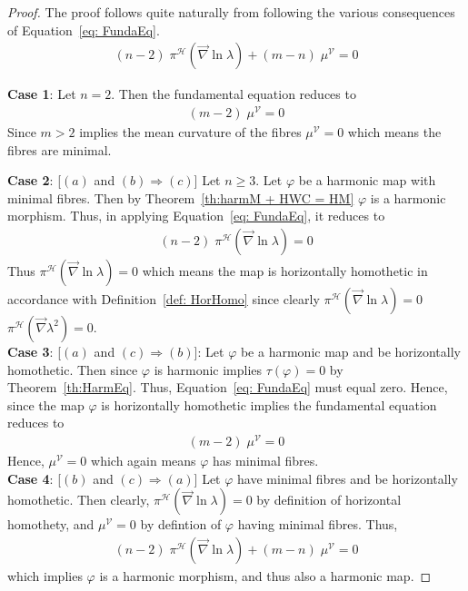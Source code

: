 \documentclass[12pt]{article}
\theoremstyle{definition}
\numberwithin{equation}{subsection}
\begin{document}
\begin{proof}
The proof follows quite naturally from following the various consequences of Equation~\ref{eq: FundaEq}. 
\begin{align*}
      (n -2)\; \pi^\mathcal{H} (\vec{\nabla} \ln \lambda ) + (m - n)\;  \mu^\mathcal{V} = 0
\end{align*}

\textbf{Case 1}: Let $n=2$. Then the fundamental equation reduces to
\begin{align*}
        (m - 2)\;  \mu^\mathcal{V} = 0
\end{align*}
Since $m>2$ implies the mean curvature of the fibres $\mu^\mathcal{V} = 0$ which means the fibres are minimal.

\textbf{Case 2}: [$(a)$ and $(b) \Rightarrow (c)$] Let $n \geq 3$. Let $\varphi$ be a harmonic map with minimal fibres. Then by Theorem~\ref{th:harmM + HWC = HM} $\varphi$ is a harmonic morphism. Thus, in applying Equation~\ref{eq: FundaEq}, it reduces to
\begin{align*}
      (n - 2)\; \pi^\mathcal{H} (\vec{\nabla} \ln \lambda )  = 0
\end{align*}
Thus $\pi^\mathcal{H} (\vec{\nabla} \ln \lambda )  = 0$ which means the map is horizontally homothetic in accordance with Definition~\ref{def: HorHomo} since clearly $\pi^\mathcal{H} (\vec{\nabla} \ln \lambda )  = 0$ \Longleftrightarrow\; $\pi^\mathcal{H} (\vec{\nabla} \lambda^2 )  = 0$.\\

\textbf{Case 3}: [$(a)$ and $(c) \Rightarrow (b)$]: Let $\varphi$ be a harmonic map and be horizontally homothetic. Then since $\varphi$ is harmonic implies $\tau(\varphi) = 0$ by Theorem~\ref{th:HarmEq}. Thus, Equation~\ref{eq: FundaEq} must equal zero. Hence, since the map $\varphi$ is horizontally homothetic implies the fundamental equation reduces to
\begin{align*}
        (m - 2)\;  \mu^\mathcal{V} = 0
\end{align*}
Hence, $\mu^\mathcal{V}=0$ which again means $\varphi$ has minimal fibres.\\

\textbf{Case 4}: [$(b)$ and $(c) \Rightarrow (a)$] Let $\varphi$ have minimal fibres and be horizontally homothetic. Then clearly, $\pi^\mathcal{H}(\vec{\nabla} \ln \lambda) = 0$ by definition of horizontal homothety, and $\mu^\mathcal{V} = 0$ by defintion of $\varphi$ having minimal fibres. Thus,
\begin{align*}
      (n -2)\; \pi^\mathcal{H} (\vec{\nabla} \ln \lambda ) + (m - n)\;  \mu^\mathcal{V} = 0
\end{align*}
which implies $\varphi$ is a harmonic morphism, and thus also a harmonic map. 
\end{proof}
\end{document}
